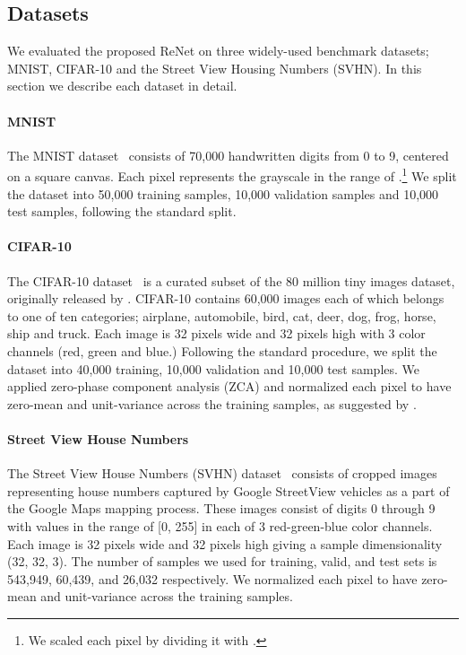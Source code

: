 \documentclass{article} \usepackage{nips15submit_e,times}
\begin{document}
\subsection{Datasets}

We evaluated the proposed ReNet on three widely-used benchmark datasets; MNIST,
CIFAR-10 and the Street View Housing Numbers (SVHN). In this section we describe 
each dataset in detail.

\paragraph{MNIST}
The MNIST dataset~\citep{Lecun99objectrecognition} consists of 70,000
handwritten digits from 0 to 9, centered on a  square canvas. Each
pixel represents the grayscale in the range of .\footnote{
    We scaled each pixel by dividing it with .
} 
We split the dataset into 50,000 training samples, 10,000 validation
samples and 10,000 test samples, following the standard split.

\paragraph{CIFAR-10}
The CIFAR-10 dataset~\citep{KrizhevskyHinton2009} is a curated subset of the 80
million tiny images dataset, originally released by
\citet{Torralba+Fergus+Freeman-2008}. CIFAR-10 contains 60,000 images each of which
belongs to one of ten categories; airplane, automobile, bird, cat, deer, dog,
frog, horse, ship and truck. Each image is 32 pixels wide and 32 pixels high
with 3 color channels (red, green and blue.) Following the standard procedure,
we split the dataset into 40,000 training, 10,000 validation and 10,000 test
samples. We applied zero-phase component analysis (ZCA) and normalized each pixel
to have zero-mean and unit-variance across the training
samples, as suggested by \citet{KrizhevskyHinton2009}.

\paragraph{Street View House Numbers}
The Street View House Numbers (SVHN) dataset~\citep{Netzer-wkshp-2011} consists 
of cropped images representing house numbers captured by Google StreetView 
vehicles as a part of the Google Maps mapping process. These images consist of
digits 0 through 9 with values in the range of [0, 255] in each of 3
red-green-blue color channels. Each image is 32 pixels wide and 32 pixels
high giving a sample dimensionality (32, 32, 3). The number of samples we used for
training, valid, and test sets is 543,949, 60,439, and 26,032 respectively. We
normalized each pixel to have zero-mean and unit-variance across the training
samples.
\end{document}
